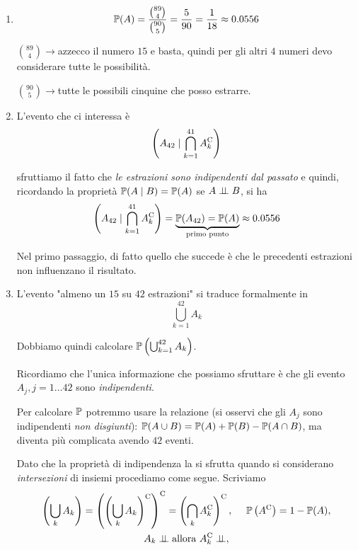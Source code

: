 \begin{enumerate}
\item \begin{equation*}
\mathbb{P}( A) =\frac{\binom{89}{4}}{\binom{90}{5}} =\frac{5}{90} =\frac{1}{18} \approx 0.0556
\end{equation*}

$\binom{89}{4}\rightarrow $azzecco il numero $15$ e basta, quindi per gli altri $4$ numeri devo considerare tutte le possibilità.

$\binom{90}{5}\rightarrow $tutte le possibili cinquine che posso estrarre.
\item L'evento che ci interessa è\begin{equation*}
\left( A_{42} \mid \bigcap _{k=1}^{41} A_{k}^{\mathrm{C}}\right)
\end{equation*}

sfruttiamo il fatto che \textit{le estrazioni sono indipendenti dal passato} e quindi, ricordando la proprietà $\mathbb{P}( A\mid B) =\mathbb{P}( A)$ se $A\perp \!\!\! \perp B$, si ha
\begin{equation*}
\left( A_{42} \mid\bigcap _{k=1}^{41} A_{k}^{\mathrm{C}}\right) =\underbrace{\mathbb{P}( A_{42}) =\mathbb{P}( A)}_{\text{primo punto}} \approx 0.0556
\end{equation*}

Nel primo passaggio, di fatto quello che succede è che le precedenti estrazioni non influenzano il risultato.
\item L'evento "almeno un $15$ su $42$ estrazioni" si traduce formalmente in
\begin{equation*}
\bigcup _{k=1}^{42} A_{k}
\end{equation*}

Dobbiamo quindi calcolare $\mathbb{P}\left(\bigcup _{k=1}^{42} A_{k}\right)$.

Ricordiamo che l'unica informazione che possiamo sfruttare è che gli evento $A_{j} ,j=1\dots 42$ sono \textit{indipendenti}.

Per calcolare $\mathbb{P}$ potremmo usare la relazione (si osservi che gli $A_{j}$ sono indipendenti \textit{non disgiunti}): $\mathbb{P}( A\cup B) =\mathbb{P}( A) +\mathbb{P}( B) -\mathbb{P}( A\cap B)$, ma diventa più complicata avendo $42$ eventi.

Dato che la proprietà di indipendenza la si sfrutta quando si considerano \textit{intersezioni} di insiemi procediamo come segue. Scriviamo
\begin{gather*}
\left(\bigcup _{k} A_{k}\right) =\left(\left(\bigcup _{k} A_{k}\right)^{\mathrm{C}}\right)^{\mathrm{C}} =\left(\bigcap _{k} A_{k}^{\mathrm{C}}\right)^{\mathrm{C}} ,\ \ \ \ \mathbb{P}\left( A^{\mathrm{C}}\right) =1-\mathbb{P}( A) ,\\
A_{k} \perp \!\!\! \perp \text{allora} \ A_{k}^{\mathrm{C}} \perp \!\!\! \perp ,
\end{gather*}


\end{enumerate}
